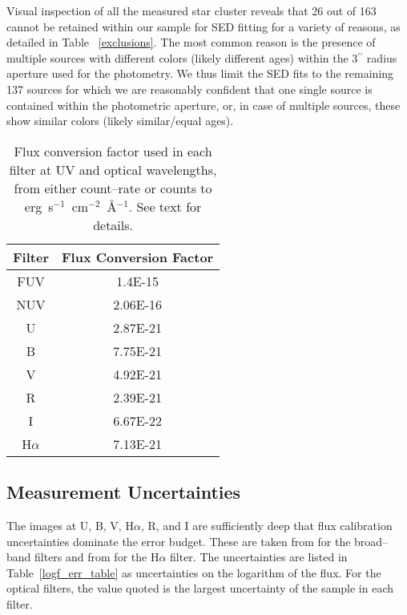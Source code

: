 \documentclass{aastex63}
\begin{document}
Visual inspection of all the measured star cluster reveals that 26 out of 163 cannot be retained  within our sample for SED fitting for a variety  of reasons, as detailed in Table ~\ref{exclusions}. The most common reason is the presence of multiple sources with different colors (likely different ages) within the 3$^{\prime\prime}$ radius aperture used for the photometry. We thus limit the SED fits to the remaining 137 sources for which  we are reasonably confident that one single source is contained within the photometric aperture, or, in case of multiple sources, these show similar colors (likely similar/equal ages).

\begin{table}[!htb]
\centering
\begin{tabular}{@{}cc@{}}
\toprule
Filter    & Flux Conversion Factor     \\ \hline
FUV       & 1.4E-15                    \\
NUV       & 2.06E-16                   \\ 
U         & 2.87E-21                   \\
B         & 7.75E-21                   \\
V         & 4.92E-21                   \\
R         & 2.39E-21                   \\
I         & 6.67E-22                   \\
H$\alpha$ & 7.13E-21                   \\ \hline
\end{tabular}
    \caption{Flux conversion factor used in each filter at UV and optical wavelengths, from either count--rate or counts to erg~s$^{-1}$~cm$^{-2}$~\r{A}$^{-1}$. See text for details.}
    \label{f_conv_table}
\end{table}

\subsection{Measurement Uncertainties}
The images at U, B, V, H$\alpha$, R, and I are sufficiently deep that flux calibration uncertainties dominate the error budget. These are taken from \citet{Massey+2006} for the broad--band filters and from \citet{Massey+2007} for the  H$\alpha$ filter. The uncertainties are listed in Table~\ref{logf_err_table} as uncertainties on the logarithm of the flux. For the optical filters, the value quoted is the largest uncertainty of the sample in each filter.
\end{document}
